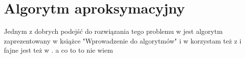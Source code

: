 \section{Algorytm aproksymacyjny}

Jednym z dobrych podejść do rozwiązania tego problemu w  jest algorytm zaprezentowany w książce "Wprowadzenie do algorytmów" \cite{Cormen2012} i w \cite{Cormen1994} korzystam też z \cite{Vazirani} i \cite{Papadimitriou} fajne jest też w \cite{LapChiLau}. a co to to nie wiem \cite{Lap_csc5160:combinatorial}


